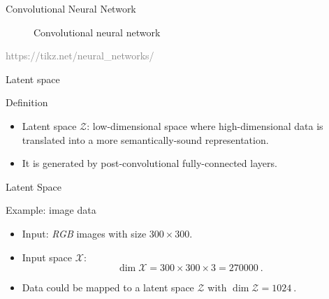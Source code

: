 \begin{frame}{Convolutional Neural Network}
\begin{figure}
{
        }
        \caption*{Convolutional neural network}
    \end{figure}
    \begin{flushright}
        \tiny{\textcolor{gray}{https://tikz.net/neural\_networks/}}
    \end{flushright}
\end{frame}

\begin{frame}{Latent space}
    \begin{definitionblock}{Definition}
        \centering
        \begin{itemize}
            \item<1-> Latent space $\mathcal{Z}$: low-dimensional space where high-dimensional data is translated into a more semantically-sound representation.
            \item <2-> It is generated by post-convolutional fully-connected layers.
        \end{itemize}
    \end{definitionblock}
\end{frame}

\begin{frame}{Latent Space}
    \begin{normalblock}{Example: image data}
        \begin{itemize}
            \item <1-> Input: \emph{RGB} images with size $300 \times 300$.
            \item <2-> Input space $\mathcal{X}$:
            \[
                \dim{\mathcal{X}} = 300\times300\times3 = \SI{270000}{}.
            \]
            \item <3-> Data could be mapped to a latent space $\mathcal{Z}$ with $\dim \mathcal{Z}= \SI{1024}{}$.
        \end{itemize}
    \end{normalblock}
\end{frame}


